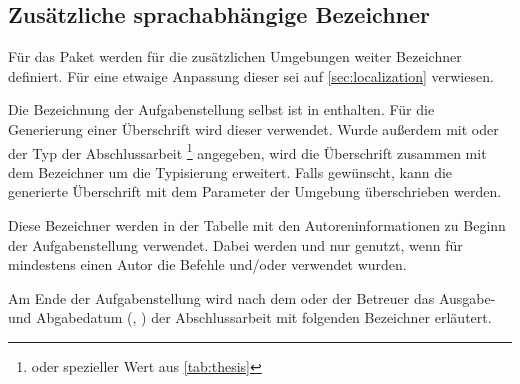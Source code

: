 \documentclass[%
  english,ngerman,%
  headings=optiontoheadandtoc,captions=tableheading,numbers=noenddot,%
  chapterpage,cdfoot,%
]{tudscrman}
\begin{document}
\subsection{Zusätzliche sprachabhängige Bezeichner}
Für das Paket  werden für die zusätzlichen Umgebungen 
weiter Bezeichner definiert. Für eine etwaige Anpassung dieser sei auf 
\autoref{sec:localization} verwiesen.
\begin{Declaration}{}
\begin{Declaration}{}
\printdeclarationlist%
Die Bezeichnung der Aufgabenstellung selbst ist in  enthalten. 
Für die Generierung einer Überschrift wird dieser verwendet. Wurde außerdem mit 
 oder  der Typ der Abschlussarbeit%
\footnote{%
   oder spezieller Wert aus \autoref{tab:thesis}
}
angegeben, wird die Überschrift zusammen mit dem Bezeichner 
um die Typisierung erweitert. Falls gewünscht, kann die generierte Überschrift 
mit dem Parameter  der Umgebung 
 überschrieben werden.
\end{Declaration}
\end{Declaration}

\begin{Declaration}{}
\begin{Declaration}{}
\begin{Declaration}{}
\begin{Declaration}{}
\printdeclarationlist%
Diese Bezeichner werden in der Tabelle mit den Autoreninformationen zu Beginn 
der Aufgabenstellung verwendet. Dabei werden  und 
 nur genutzt, wenn für mindestens einen Autor die Befehle 
 und/oder  verwendet wurden.
\end{Declaration}
\end{Declaration}
\end{Declaration}
\end{Declaration}

\begin{Declaration}{}
\begin{Declaration}{}
\printdeclarationlist%
Am Ende der Aufgabenstellung wird nach dem oder der Betreuer das Ausgabe- und 
Abgabedatum (, ) der Abschlussarbeit mit 
folgenden Bezeichner erläutert.
\end{Declaration}
\end{Declaration}
\end{document}
